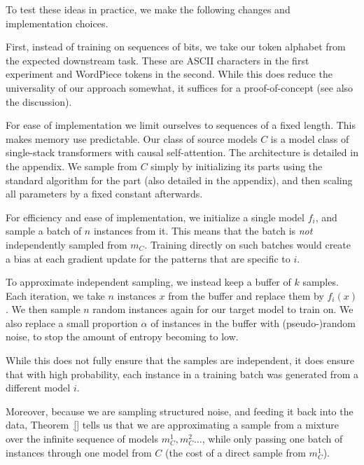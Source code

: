 \documentclass{article} %
\begin{document}
To test these ideas in practice, we make the following changes and implementation choices. 

First, instead of training on sequences of bits, we take our token alphabet from the expected downstream task. These are ASCII characters in the first experiment and WordPiece tokens in the second. While this does reduce the universality of our approach somewhat, it suffices for a proof-of-concept (see also the discussion).

For ease of implementation we limit ourselves to sequences of a fixed length. This makes memory use predictable. Our class of source models $C$ is a model class of single-stack transformers with causal self-attention. The architecture is detailed in the appendix. We sample from $C$ simply by initializing its parts using the standard algorithm for the part (also detailed in the appendix), and then scaling all parameters by a fixed constant afterwards. 

For efficiency and ease of implementation, we initialize a single model $f_i$, and sample a batch of $n$ instances from it. This means that the batch is \emph{not} independently sampled from $m_C$. Training directly on such batches would create a bias at each gradient update for the patterns that are specific to $i$. 

To approximate independent sampling, we instead keep a buffer of $k$ samples. Each iteration, we take $n$ instances $x$ from the buffer and replace them by $f_i(x)$. We then sample $n$ random instances again for our target model to train on. We also replace a small proportion $\alpha$ of instances in the buffer with (pseudo-)random noise, to stop the amount of entropy becoming to low.

While this does not fully ensure that the samples are independent, it does ensure that with high probability, each instance in a training batch was generated from a different model $i$.

Moreover, because we are sampling structured noise, and feeding it back into the data, Theorem~\ref{} tells us that we are approximating a sample from a mixture over the infinite sequence of models $m^1_C, m^2_C\ldots$, while only passing one batch of instances through one model from $C$ (the cost of a direct sample from $m^1_C$).\footnotemark
{}
\end{document}
